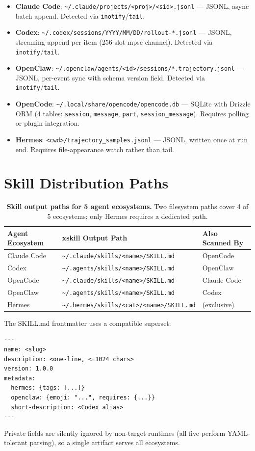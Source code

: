 \documentclass{article}
\begin{document}
\begin{itemize}
    \item \textbf{Claude Code}: \texttt{\~{}/.claude/projects/<proj>/<sid>.jsonl} --- JSONL, async batch append. Detected via \texttt{inotify}/\texttt{tail}.
    \item \textbf{Codex}: \texttt{\~{}/.codex/sessions/YYYY/MM/DD/rollout-*.jsonl} --- JSONL, streaming append per item (256-slot mpsc channel). Detected via \texttt{inotify}/\texttt{tail}.
    \item \textbf{OpenClaw}: \texttt{\~{}/.openclaw/agents/<id>/sessions/*.trajectory.jsonl} --- JSONL, per-event sync with schema version field. Detected via \texttt{inotify}/\texttt{tail}.
    \item \textbf{OpenCode}: \texttt{\~{}/.local/share/opencode/opencode.db} --- SQLite with Drizzle ORM (4 tables: \texttt{session}, \texttt{message}, \texttt{part}, \texttt{session\_message}). Requires polling or plugin integration.
    \item \textbf{Hermes}: \texttt{<cwd>/trajectory\_samples.jsonl} --- JSONL, written once at run end. Requires file-appearance watch rather than tail.
\end{itemize}

\section{Skill Distribution Paths}
\label{app:distribution}

\begin{table}[h]
\centering
\caption{\textbf{Skill output paths for 5 agent ecosystems.} Two filesystem paths cover 4 of 5 ecosystems; only Hermes requires a dedicated path.}
\label{tab:distribution}
\small
\begin{tabular}{@{}lll@{}}
\toprule
\textbf{Agent Ecosystem} & \textbf{xskill Output Path} & \textbf{Also Scanned By} \\
\midrule
Claude Code & \texttt{\~{}/.claude/skills/<name>/SKILL.md} & OpenCode \\
Codex       & \texttt{\~{}/.agents/skills/<name>/SKILL.md} & OpenClaw \\
OpenCode    & \texttt{\~{}/.claude/skills/<name>/SKILL.md} & Claude Code \\
OpenClaw    & \texttt{\~{}/.agents/skills/<name>/SKILL.md} & Codex \\
Hermes      & \texttt{\~{}/.hermes/skills/<cat>/<name>/SKILL.md} & (exclusive) \\
\bottomrule
\end{tabular}
\end{table}

The SKILL.md frontmatter uses a compatible superset:
\begin{verbatim}
---
name: <slug>
description: <one-line, <=1024 chars>
version: 1.0.0
metadata:
  hermes: {tags: [...]}
  openclaw: {emoji: "...", requires: {...}}
  short-description: <Codex alias>
---
\end{verbatim}
Private fields are silently ignored by non-target runtimes (all five perform YAML-tolerant parsing), so a single artifact serves all ecosystems.
\end{document}
